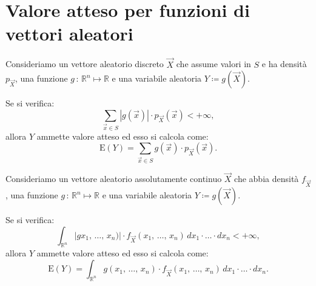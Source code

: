     \section{Valore atteso per funzioni di vettori aleatori}
        \begin{defn}[discreto]
            Consideriamo un vettore aleatorio discreto $\vec{X}$ che assume valori in $S$ e 
            ha densità $p_{\vec{X}}$, una funzione $g\,:\, \mathbb{R}^n \mapsto \mathbb{R}$ e una 
            variabile aleatoria $Y \coloneqq g(\vec{X})$.

            Se si verifica: \[
                \sum_{\vec{x} \in S} \left|g(\vec{x})\right| \cdot p_{\vec{X}}(\vec{x}) < +\infty
            ,\] allora $Y$ ammette valore atteso ed esso si calcola come:
            \begin{equation}\label{eq:Valore_atteso_vettori_discreti}
                \text{E}(Y) = \sum_{\vec{x} \in S} g(\vec{x}) \cdot p_{\vec{X}}(\vec{x})
            .\end{equation}
        \end{defn}
        \begin{defn}[continuo]
            Consideriamo un vettore aleatorio assolutamente continuo $\vec{X}$ che abbia densità 
            $f_{\vec{X}}$, una funzione $g\,:\, \mathbb{R}^n \mapsto \mathbb{R}$ e una variabile aleatoria 
            $Y \coloneqq g(\vec{X})$.

            Se si verifica: \[
                \int_{\mathbb{R}^n} \left|gx_1,\, \ldots,\, x_{n})\right| \cdot f_{\vec{X}}(x_1,\, \ldots,\, x_{n})\, dx_1 \cdot \ldots \cdot dx_n < +\infty
            ,\] allora $Y$ ammette valore atteso ed esso si calcola come:
            \begin{equation}\label{eq:Valore_atteso_vettori_continui}
                \text{E}(Y) = \int_{\mathbb{R}^n} g(x_1,\, \ldots,\, x_{n}) \cdot f_{\vec{X}}(x_1,\, \ldots,\, x_{n})\, dx_1 \cdot \ldots \cdot dx_n
            .\end{equation}
        \end{defn}
